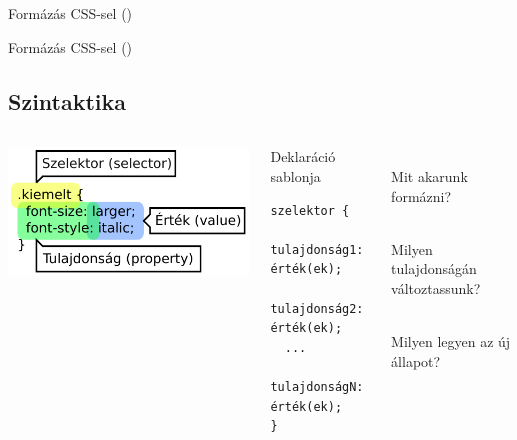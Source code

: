 \begin{frame}
  \scriptsize
  \begin{exampleblock}{Formázás CSS-sel ()}
    
  \end{exampleblock}
  \begin{exampleblock}{Formázás CSS-sel ()}
    
  \end{exampleblock}
\end{frame}

\subsection{Szintaktika}

\begin{frame}[fragile]
  \begin{columns}[c]
      \includegraphics[scale=0.75]{szintakszis.pdf}\\
      \begin{block}{Deklaráció sablonja}
      \vspace{-0.5cm}
\begin{verbatim}
szelektor {
  tulajdonság1: érték(ek);
  tulajdonság2: érték(ek);
  ...
  tulajdonságN: érték(ek);
}
\end{verbatim}
      \vspace{-0.4cm}
      \end{block}
      \begin{description}[m]
        \item[Szelektor] \hfill \\ Mit akarunk formázni?
        \item[Tulajdonság] \hfill \\ Milyen tulajdonságán változtassunk?
        \item[Érték] \hfill \\ Milyen legyen az új állapot?
      \end{description}
  \end{columns}
  
\end{frame}

